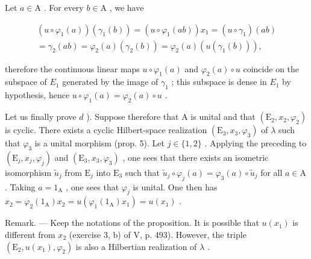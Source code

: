Let \(a \in \mathrm{A}\) . For every \(b \in \mathrm{A}\) , we have

\[
\begin{array}{c} (u \circ \varphi_ {1} (a)) (\gamma_ {1} (b)) = (u \circ \varphi_ {1} (a b)) x _ {1} = (u \circ \gamma_ {1}) (a b) \\ = \gamma_ {2} (a b) = \varphi_ {2} (a) (\gamma_ {2} (b)) = \varphi_ {2} (a) (u (\gamma_ {1} (b))), \end{array}
\]

therefore the continuous linear maps \(u \circ \varphi_1(a)\) and \(\varphi_2(a) \circ u\) coincide on the subspace of \(E_1\) generated by the image of \(\gamma_1\) ; this subspace is dense in \(E_1\) by hypothesis, hence \(u \circ \varphi_1(a) = \varphi_2(a) \circ u\) .

Let us finally prove \(d\) ). Suppose therefore that A is unital and that \((\mathrm{E}_2, x_2, \varphi_2)\) is cyclic. There exists a cyclic Hilbert-space realization \((\mathrm{E}_3, x_3, \varphi_3)\) of \(\lambda\) such that \(\varphi_3\) is a unital morphism (prop. 5). Let \(j \in \{1, 2\}\) . Applying the preceding to \((\mathrm{E}_j, x_j, \varphi_j)\) and \((\mathrm{E}_3, x_3, \varphi_3)\) , one sees that there exists an isometric isomorphism \(\widetilde{u}_j\) from \(\mathrm{E}_j\) into \(\mathrm{E}_3\) such that \(\widetilde{u}_j \circ \varphi_j(a) = \varphi_3(a) \circ \widetilde{u}_j\) for all \(a \in \mathrm{A}\) . Taking \(a = 1_{\mathrm{A}}\) , one sees that \(\varphi_j\) is unital. One then has \(x_2 = \varphi_2(1_{\mathrm{A}})x_2 = u(\varphi_1(1_{\mathrm{A}})x_1) = u(x_1)\) .

Remark. --- Keep the notations of the proposition. It is possible that \(u(x_{1})\) is different from \(x_{2}\) (exercise 3, b) of V, p. 493). However, the triple \((\mathrm{E}_{2}, u(x_{1}), \varphi_{2})\) is also a Hilbertian realization of \(\lambda\) .


